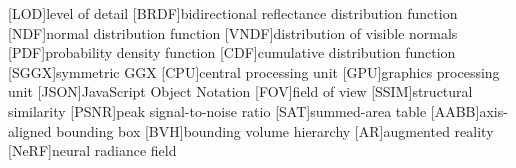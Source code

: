 [LOD]{level of detail}
[BRDF]{bidirectional reflectance distribution function}
[NDF]{normal distribution function}
[VNDF]{distribution of visible normals}
[PDF]{probability density function}
[CDF]{cumulative distribution function}
[SGGX]{symmetric GGX}
[CPU]{central processing unit}
[GPU]{graphics processing unit}
[JSON]{JavaScript Object Notation}
[FOV]{field of view}
[SSIM]{structural similarity}
[PSNR]{peak signal-to-noise ratio}
[SAT]{summed-area table}
[AABB]{axis-aligned bounding box}
[BVH]{bounding volume hierarchy}
[AR]{augmented reality}
[NeRF]{neural radiance field}
